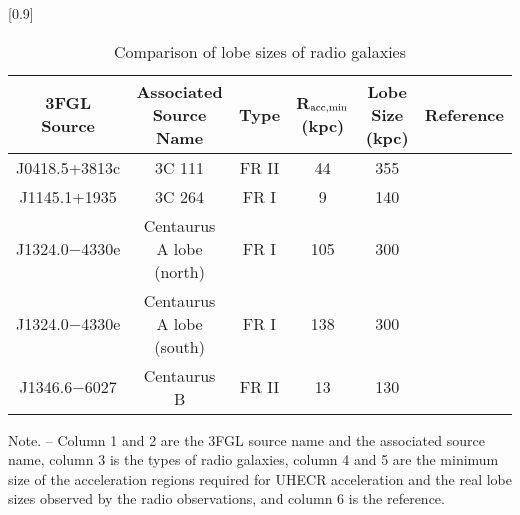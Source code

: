\documentclass{aastex6}
\begin{document}
\begin{table}[h]
\centering
\caption{Comparison of lobe sizes of radio galaxies }
\label{tab:tableradio}
\scalebox{1.0}[0.9]{
 \begin{tabular}[c]{cccccc} \hline
3FGL Source & Associated Source Name & Type & R$_{\rm{acc,min}}$ (kpc) & Lobe Size (kpc) & Reference\\
\hline
J0418.5+3813c & 3C 111 & FR II & 44& 355 & \cite{3C111}\\
J1145.1+1935 & 3C 264 & FR I & 9& 140 & \cite{3C264}\\
J1324.0$-$4330e & Centaurus A lobe (north) & FR I & 105 & 300 & \cite{CenAlobe} \\
J1324.0$-$4330e & Centaurus A lobe (south) & FR I & 138 & 300 & \cite{CenAlobe} \\
J1346.6$-$6027 & Centaurus B & FR II & 13 & 130 & \cite{CenB}\\
\hline
\end{tabular}
}
\end{table}
\begin{flushleft}
\footnotesize{Note. -- Column 1 and 2 are the 3FGL source name and the associated source name, column 3 is the types of radio galaxies, column 4 and 5 are the minimum size of the acceleration regions required for UHECR acceleration and the real lobe sizes observed by the radio observations, and column 6 is the reference.}
\normalsize{}
\end{flushleft}
\end{document}
